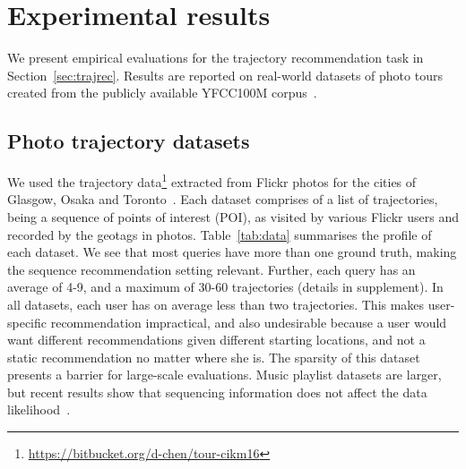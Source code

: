 
\secmoveup
\section{Experimental results}
\label{sec:experiment}
\textmoveup



We present empirical evaluations for the trajectory recommendation task in
Section~\ref{sec:trajrec}.
Results are reported on real-world datasets of photo tours
created from the publicly available YFCC100M corpus~\cite{thomee2016yfcc100m}.


\secmoveup
\subsection{Photo trajectory datasets}
\label{sec:dataset}
\textmoveup

We used the trajectory data\footnote{\url{https://bitbucket.org/d-chen/tour-cikm16}}
extracted from Flickr photos for the cities of Glasgow, Osaka and
Toronto~\cite{ijcai15,cikm16paper}.
Each dataset comprises of a
list of trajectories, being a sequence of points of interest (POI),
as visited by various Flickr users and recorded by the geotags in photos.
Table~\ref{tab:data} summarises the profile of each dataset.
We see that most queries have more than one ground truth, making the sequence recommendation setting relevant. Further, each query has an average of 4-9, and a maximum of 30-60 trajectories (details in supplement).
In all datasets,
each user has on average less than two trajectories.
This makes user-specific recommendation impractical, and also undesirable because
a user would want different recommendations given different starting locations, and not a static recommendation no matter where she is.
The sparsity of this dataset presents a barrier for large-scale evaluations.
Music playlist datasets are larger, but recent results show that sequencing information does not affect the data likelihood~\cite{chen2012playlist}.

